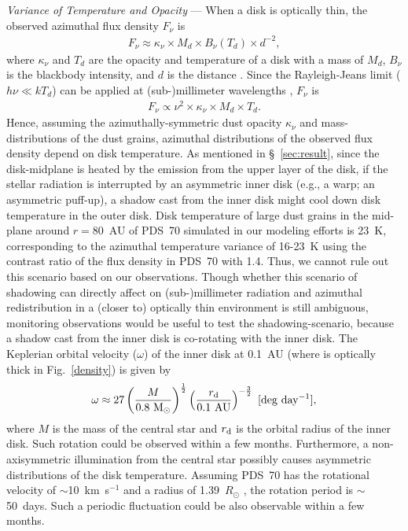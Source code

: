 \documentclass[apj]{emulateapj-rtx4}
\begin{document}
  {\it Variance of Temperature and Opacity} ---
  When a disk is optically thin, the observed azimuthal flux density $F_{\nu}$ is
  \begin{eqnarray}
    F_{\nu} \approx \kappa_{\nu} \times M_{d} \times B_{\nu}(T_{d}) \times d^{-2}, 
  \end{eqnarray}
  where $\kappa_{\nu}$ and $T_{d}$ are the opacity and temperature of a disk with a mass of $M_{d}$, 
  $B_{\nu}$ is the blackbody intensity, and $d$ is the distance \citep[c.f.,][]{drai06}. Since  
  the Rayleigh-Jeans limit ($h\nu \ll kT_{d}$) can be applied at (sub-)millimeter wavelengths \citep{beck90,beck91},
  $F_{\nu}$ is 
  \begin{eqnarray}
    F_{\nu} \propto \nu^{2} \times \kappa_{\nu} \times M_{d} \times T_{d}.
    \label{flux}
  \end{eqnarray}
  Hence, assuming the azimuthally-symmetric dust opacity $\kappa_{\nu}$ and mass-distributions of the dust grains, azimuthal 
  distributions of the observed flux density depend on disk temperature. As mentioned in \S~\ref{sec:result}, since 
  the disk-midplane is heated by the emission from the upper layer of the disk, if the stellar radiation is interrupted by an asymmetric 
  inner disk (e.g., a warp; an asymmetric puff-up), a shadow cast from the inner disk might cool down disk temperature in the outer 
  disk. 
  Disk temperature of large dust grains in the mid-plane around $r=$80~AU of PDS~70 
  simulated in our modeling efforts is 23~K, corresponding
  to the azimuthal temperature variance of 16-23~K using the contrast ratio of the flux density in PDS~70 with 1.4. 
  Thus, we cannot rule out this scenario based on our observations. 
    Though whether this scenario of shadowing can directly affect on (sub-)millimeter radiation and azimuthal redistribution
    in a (closer to) optically thin environment is still ambiguous, monitoring observations would be useful to test 
    the shadowing-scenario, because a shadow cast from the inner disk is co-rotating with the inner disk.
  The Keplerian orbital velocity ($\omega$) of the inner disk at 0.1~AU (where is optically thick in Fig.~\ref{density}) is given by 
  \begin{eqnarray}
  \omega \approx 27 \left( \frac{M}{0.8~{\rm M}_{\odot}}\right)^{\frac{1}{2}} \left( \frac{r_{{\rm d}}}{0.1~{\rm AU}} \right)^{-\frac{3}{2}} \ {\rm [deg~day^{-1}]},  
  \end{eqnarray}
  where $M$ is the mass of the central star and $r_{{\rm d}}$ is the orbital radius of the inner disk. Such rotation could be 
  observed within a few months. 
  Furthermore, a non-axisymmetric illumination from the central star \citep{taka14}
  possibly causes asymmetric distributions of the disk temperature. Assuming PDS~70 has the rotational velocity of $\sim$10~km~s$^{-1}$ 
  and a radius of 1.39~$R_{\odot}$ \citep{greg02}, the rotation period is $\sim$50~days. Such a periodic fluctuation
  could be also observable within a few months. 
\end{document}
